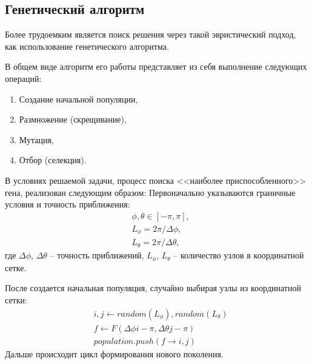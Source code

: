 \subsection{Генетический алгоритм}
\noindent\indent Более трудоемким является поиск решения через такой эвристический
подход, как использование генетического алгоритма.\par
  В общем виде алгоритм его работы представляет из себя выполнение следующих операций:
\begin{enumerate}
  \item Создание начальной популяции,
  \item Размножение (скрещивание),
  \item Мутация,
  \item Отбор (селекция).
\end{enumerate}\par
  В условиях решаемой задачи, процесс поиска <<наиболее приспособленного>> гена,
реализован следующим образом:
  Первоначально указываются граничные условия и точность приближения:
\begin{equation}
  \begin{aligned}
    &\phi, \theta \in [-\pi, \pi], \\
    &L_{\phi} = 2\pi / \Delta \phi, \\
    &L_{\theta} = 2\pi / \Delta \theta,
  \end{aligned}
\end{equation}
где $\Delta\phi$, $\Delta\theta$ -- точность приближений,
$L_{\phi}$, $L_{\theta}$ -- количество узлов в координатной сетке.\par
  После создается начальная популяция, случайно выбирая узлы из координатной сетки:
\begin{equation}
  \begin{aligned}
    & i, j \leftarrow random(L_\phi), random(L_\theta) \\
    & f \leftarrow F(\Delta \phi i - \pi, \Delta \theta j - \pi) \\
    & population.push(f \rightarrow i, j)
  \end{aligned}
\end{equation}
  Дальше происходит цикл формирования нового поколения.
